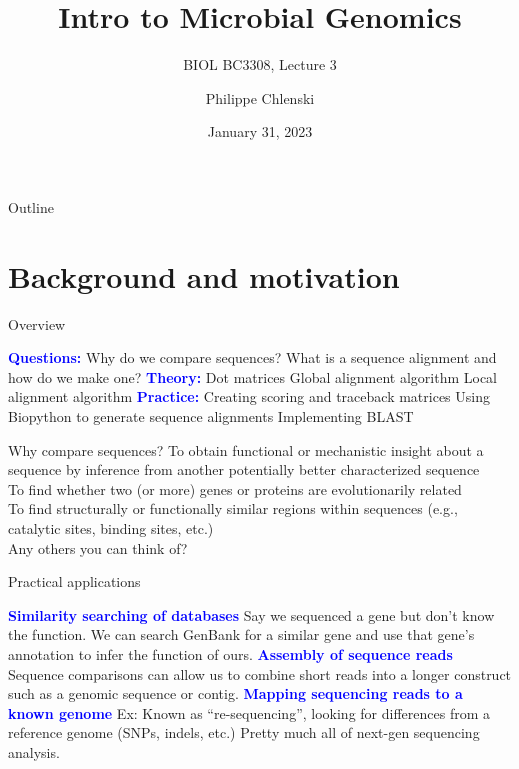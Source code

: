 \documentclass{beamer}
\title{Intro to Microbial Genomics}
\subtitle{BIOL BC3308, Lecture 3}
\author{Philippe Chlenski}
\date{January 31, 2023}
\newcommand{\blu}[1]{\textcolor{blue}{\textbf{#1}}}
\begin{document}
\begin{frame}[plain]
\titlepage
\end{frame}

\begin{frame}{Outline}
\tableofcontents
\end{frame}

\section{Background and motivation}

\begin{frame}{Overview}
\begin{outline}
\1[] \blu{Questions:}
    \2 Why do we compare sequences?
    \2 What is a sequence alignment and how do we make one?
\1[] \blu{Theory:}
    \2 Dot matrices
    \2 Global alignment algorithm
    \2 Local alignment algorithm
\1[] \blu{Practice:}
    \2 Creating scoring and traceback matrices
    \2 Using Biopython to generate sequence alignments
    \2 Implementing BLAST
\end{outline}
\end{frame}

\begin{frame}{Why compare sequences?}
To obtain functional or mechanistic insight about a sequence by inference from another potentially better characterized sequence\\
\bigskip
To find whether two (or more) genes or proteins are evolutionarily related\\
\bigskip
To find structurally or functionally similar regions within sequences (e.g., catalytic sites, binding sites, etc.)\\
\bigskip
Any others you can think of?
\end{frame}

\begin{frame}{Practical applications}
\begin{outline}
    \1[] \blu{Similarity searching of databases}
        \2 Say we sequenced a gene but don’t know the function. We can search GenBank for a similar gene and use that gene’s annotation to infer the function of ours.
    \1[] \blu{Assembly of sequence reads}
        \2 Sequence comparisons can allow us to combine short reads into a longer construct such as a genomic sequence or contig.
    \1[] \blu{Mapping sequencing reads to a known genome}
        \2 Ex: Known as “re-sequencing”, looking for differences from a reference genome (SNPs, indels, etc.)
        \2 Pretty much all of next-gen sequencing analysis.
\end{outline}
\end{frame}
\end{document}
